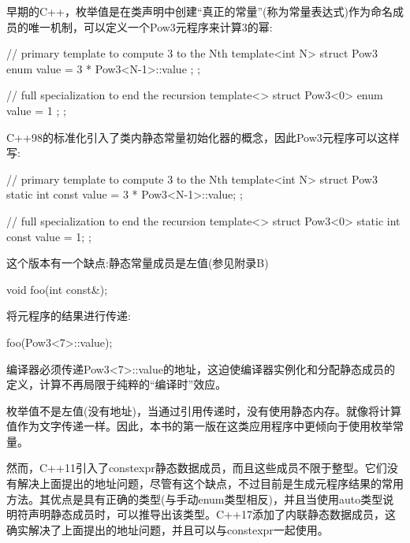 
早期的C++，枚举值是在类声明中创建“真正的常量”(称为常量表达式)作为命名成员的唯一机制，可以定义一个Pow3元程序来计算3的幂:

\begin{cpp}
// primary template to compute 3 to the Nth
template<int N>
struct Pow3 {
	enum { value = 3 * Pow3<N-1>::value };
};

// full specialization to end the recursion
template<>
struct Pow3<0> {
	enum { value = 1 };
};
\end{cpp}

C++98的标准化引入了类内静态常量初始化器的概念，因此Pow3元程序可以这样写:

\begin{cpp}
// primary template to compute 3 to the Nth
template<int N>
struct Pow3 {
	static int const value = 3 * Pow3<N-1>::value;
};

// full specialization to end the recursion
template<>
struct Pow3<0> {
	static int const value = 1;
};
\end{cpp}

这个版本有一个缺点:静态常量成员是左值(参见附录B)

\begin{cpp}
void foo(int const&);
\end{cpp}

将元程序的结果进行传递:

\begin{cpp}
foo(Pow3<7>::value);
\end{cpp}

编译器必须传递Pow3<7>::value的地址，这迫使编译器实例化和分配静态成员的定义，计算不再局限于纯粹的“编译时”效应。

枚举值不是左值(没有地址)，当通过引用传递时，没有使用静态内存。就像将计算值作为文字传递一样。因此，本书的第一版在这类应用程序中更倾向于使用枚举常量。

然而，C++11引入了constexpr静态数据成员，而且这些成员不限于整型。它们没有解决上面提出的地址问题，尽管有这个缺点，不过目前是生成元程序结果的常用方法。其优点是具有正确的类型(与手动enum类型相反)，并且当使用auto类型说明符声明静态成员时，可以推导出该类型。C++17添加了内联静态数据成员，这确实解决了上面提出的地址问题，并且可以与constexpr一起使用。























